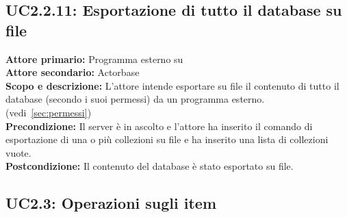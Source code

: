 \documentclass{scalatekids-article}
\begin{document}
\subsection{UC2.2.11: Esportazione di tutto il database su file}

\textbf{Attore primario:} Programma esterno su \\
\textbf{Attore secondario:} Actorbase\\
\textbf{Scopo e descrizione:} L'attore intende esportare su file il contenuto di tutto il database (secondo i suoi permessi) da un programma  esterno. (vedi~\ref{sec:permessi})\\
\textbf{Precondizione:} Il server è in ascolto e l'attore ha inserito il comando di esportazione di una o più collezioni su file e ha inserito una lista di collezioni vuote.\\
\textbf{Postcondizione:} Il contenuto del database è stato esportato su file.

\subsection{UC2.3: Operazioni sugli item}
\end{document}
